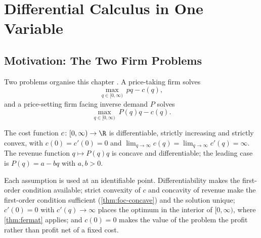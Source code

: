 
\chapter{Differential Calculus in One Variable}
\label{ch:calculus1}

\section{Motivation: The Two Firm Problems}\label{sec:c1-motivation}

Two problems organise this chapter
\autocite[slide 3]{fukuda2026calculus}. A price-taking firm solves
\begin{equation}\label{eq:price-taker}
	\max_{q\in[0,\infty)}\ pq-c(q),
\end{equation}
and a price-setting firm facing inverse demand $P$ solves
\begin{equation}\label{eq:price-setter}
	\max_{q\in[0,\infty)}\ P(q)q-c(q).
\end{equation}

\begin{assumption}\label{ass:firm}
	The cost function $c\colon[0,\infty)\to\R$ is differentiable, strictly
	increasing and strictly convex, with $c(0)=c'(0)=0$ and
	$\lim_{q\to\infty}c(q)=\lim_{q\to\infty}c'(q)=\infty$. The revenue function
	$q\mapsto P(q)q$ is concave and differentiable; the leading case is
	$P(q)=a-bq$ with $a,b>0$.
\end{assumption}

Each assumption is used at an identifiable point. Differentiability makes the
first-order condition available; strict convexity of $c$ and concavity of
revenue make the first-order condition sufficient
(\autoref{thm:foc-concave}) and the solution unique; $c'(0)=0$ with
$c'(q)\to\infty$ places the optimum in the interior of $[0,\infty)$, where
\autoref{thm:fermat} applies; and $c(0)=0$ makes the value of the problem the
profit rather than profit net of a fixed cost.


